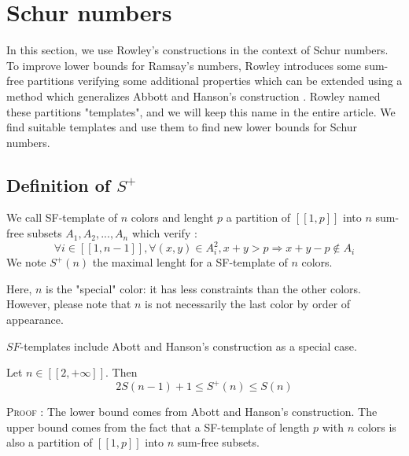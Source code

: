 \section{Schur numbers}

\qquad In this section, we use Rowley's constructions \cite{RowleyRamsey} in the context of Schur numbers. To improve lower bounds
for Ramsay's numbers, Rowley introduces some sum-free partitions verifying some additional properties which can be extended using a 
method which generalizes Abbott and Hanson's  construction \cite{AbbottHanson}. Rowley named these partitions "templates", and 
we will keep this name in the entire article. We find suitable templates and use them to find new lower bounds for Schur numbers.

\subsection{Definition of \(S^+\)}

\begin{definition}
We call SF-template of \(n\) colors and lenght \(p\) a partition of \( [\![1,p]\!]\) into \(n\) sum-free subsets \(A_1,
A_2, ..., A_n\) which verify :
	\[
	\forall i \in [\![1, n-1]\!], \forall (x,y) \in A_i^2, x+y > p
	\Longrightarrow x+y-p \notin A_i
	\]
	We note \(S^+(n)\) the maximal lenght for a SF-template of \(n\) colors.
\end{definition}

\begin{remark}
	Here, \(n\) is the "special" color: it has less constraints than the other colors. However, please note that \(n\) 
	is not necessarily the last color by order of appearance.
\end{remark}

\begin{remark}
	\(SF\)-templates include Abott and Hanson's construction \cite{AbbottHanson} as a special case.
\end{remark}

\begin{proposition}
	Let \(n \in [\![2, +\infty]\!]\). Then
	\[
	2S(n-1)+1 \leqslant S^+(n) \leqslant S(n)
	\]
\end{proposition}

\textsc{Proof :} The lower bound comes from Abott and Hanson's construction. The upper bound comes
from the fact that a SF-template of length \(p\) with \(n\) colors is also a partition of
\([\![1, p]\!]\) into \(n\) sum-free subsets.

